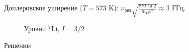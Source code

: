 \vspace{-2mm}
Доплеровское уширение ($T = 573$ K): $\nu_\text{рез} \sqrt{\frac{8 k T \ln 2}{m_{\text{Li}}c^2}} \approx 3$ ГГц.

\vspace{-2mm}
\begin{figure}[h]
\centering
{}
\caption{Уровни ${}^7$Li, $I = 3/2$}
\end{figure}


\vspace{-5mm}

Решение: 